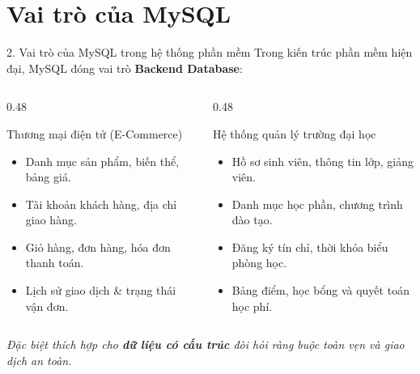 \documentclass[aspectratio=169,11pt]{beamer}
\newcommand{\kw}[1]{\textcolor{dbblue}{\textbf{#1}}}
\newcommand{\smallgap}{\vspace{0.25em}}
\begin{document}
\section{Vai trò của MySQL}
\begin{frame}{2. Vai trò của MySQL trong hệ thống phần mềm}
Trong kiến trúc phần mềm hiện đại, MySQL đóng vai trò \kw{Backend Database}:
\smallgap
\begin{columns}[t]
  \begin{column}{0.48\textwidth}
    \begin{exampleblock}{Thương mại điện tử (E-Commerce)}
      \begin{itemize}\footnotesize
        \item Danh mục sản phẩm, biến thể, bảng giá.
        \item Tài khoản khách hàng, địa chỉ giao hàng.
        \item Giỏ hàng, đơn hàng, hóa đơn thanh toán.
        \item Lịch sử giao dịch \& trạng thái vận đơn.
      \end{itemize}
    \end{exampleblock}
  \end{column}
  \begin{column}{0.48\textwidth}
    \begin{exampleblock}{Hệ thống quản lý trường đại học}
      \begin{itemize}\footnotesize
        \item Hồ sơ sinh viên, thông tin lớp, giảng viên.
        \item Danh mục học phần, chương trình đào tạo.
        \item Đăng ký tín chỉ, thời khóa biểu phòng học.
        \item Bảng điểm, học bổng và quyết toán học phí.
      \end{itemize}
    \end{exampleblock}
  \end{column}
\end{columns}

\smallgap
\textit{Đặc biệt thích hợp cho \textbf{dữ liệu có cấu trúc} đòi hỏi ràng buộc toàn vẹn và giao dịch an toàn.}
\end{frame}

\end{document}
